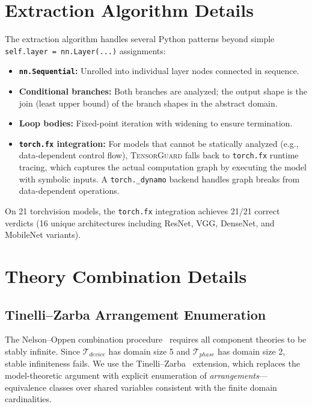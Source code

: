 \documentclass[11pt]{article}
\begin{document}
\appendix

\section{Extraction Algorithm Details}\label{app:extraction-details}

The extraction algorithm handles several Python patterns beyond
simple \texttt{self.layer = nn.Layer(...)} assignments:

\begin{itemize}[leftmargin=2em]
  \item \textbf{\texttt{nn.Sequential}:} Unrolled into individual
    layer nodes connected in sequence.
  \item \textbf{Conditional branches:} Both branches are analyzed;
    the output shape is the join (least upper bound) of the branch
    shapes in the abstract domain.
  \item \textbf{Loop bodies:} Fixed-point iteration with widening
    to ensure termination.
  \item \textbf{\texttt{torch.fx} integration:} For models that
    cannot be statically analyzed (e.g., data-dependent control flow),
    \textsc{TensorGuard} falls back to \texttt{torch.fx} runtime
    tracing, which captures the actual computation graph by executing
    the model with symbolic inputs.  A \texttt{torch.\_dynamo} backend
    handles graph breaks from data-dependent operations.
\end{itemize}

On 21 torchvision models, the \texttt{torch.fx} integration
achieves 21/21 correct verdicts (16 unique architectures including
ResNet, VGG, DenseNet, and MobileNet variants).


\section{Theory Combination Details}\label{app:tinelli-zarba-details}

\subsection{Tinelli--Zarba Arrangement Enumeration}

The Nelson--Oppen combination procedure~\cite{nelsonoppen79} requires
all component theories to be stably infinite.  Since
$\mathcal{T}_{\mathit{device}}$ has domain size 5 and
$\mathcal{T}_{\mathit{phase}}$ has domain size 2, stable infiniteness
fails.  We use the Tinelli--Zarba~\cite{tinelli03} extension, which
replaces the model-theoretic argument with explicit enumeration of
\emph{arrangements}---equivalence classes over shared variables
consistent with the finite domain cardinalities.
\end{document}
